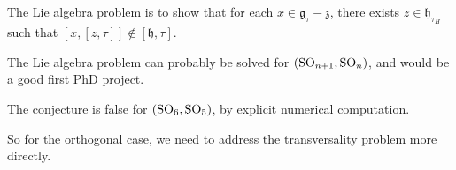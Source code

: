 \documentclass[reqno]{amsart} 
\begin{document}
The Lie algebra problem is to show that for each $x \in \mathfrak{g}_\tau - \mathfrak{z}$, there exists $z \in \mathfrak{h}_{\tau_H}$ such that $[x,[z,\tau]] \notin [\mathfrak{h},\tau]$.

\begin{conjecture}
  The Lie algebra problem can probably be solved for $(\operatorname{SO}_{n+1}, \operatorname{SO}_n)$, and would be a good first PhD project.
\end{conjecture}

\begin{example}
  The conjecture is false for $(\operatorname{SO}_6, \operatorname{SO}_5)$, by explicit numerical computation.
\end{example}

So for the orthogonal case, we need to address the transversality problem more directly.


{} 
\end{document}
